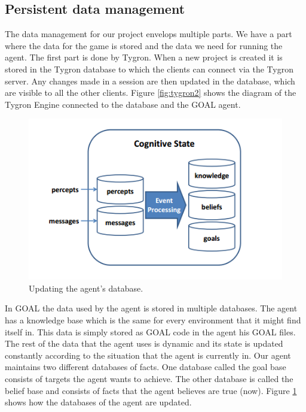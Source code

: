 \newpage
\subsection{Persistent data management}
The data management for our project envelops multiple parts. We have a part where the data for the game is stored and the data we need for running the agent. The first part is done by Tygron. When a new project is created it is stored in the Tygron database to which the clients can connect via the Tygron server. Any changes made in a session are then updated in the database, which are visible to all the other clients. Figure \ref{fig:tygron2} shows the diagram of the Tygron Engine connected to the database and the GOAL agent.

\begin{figure}[h!]
  \includegraphics[width=\linewidth]{agentstate.png}
  \caption{Updating the agent's database.}
  \label{fig:agentstate1}
\end{figure}
In GOAL the data used by the agent is stored in multiple databases. The agent has a knowledge base which is the same for every environment that it might find itself in. This data is simply stored as GOAL code in the agent his GOAL files. The rest of the data that the agent uses is dynamic and its state is updated constantly according to the situation that the agent is currently in. Our agent maintains two different databases of facts. One database called the goal base consists of targets the agent wants to achieve. The other database is called the belief base and consists of facts that the agent believes are true (now). Figure \ref{fig:agentstate1} \cite{goal} shows how the databases of the agent are updated.



